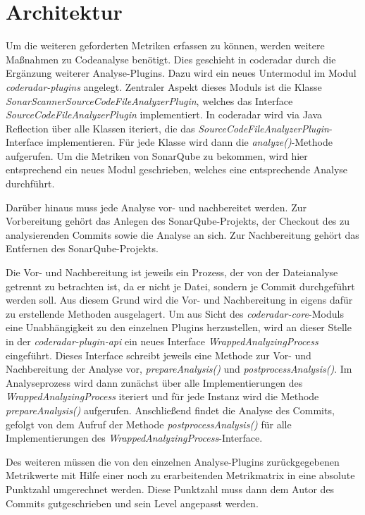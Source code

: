 \documentclass[
	oneside,  %
	ngerman, 
	final, 
	11pt, 
	a4paper, 
	1.1headlines, 
	headinclude=false, 
	footinclude=false, 
	mpinclude=false, 
	pagesize, 
	onecolumn, 
	titlepage, 
	parskip=half, 
	headsepline, 
	chapterprefix=false, 
	version=first, 
	listof=totoc, 
	bibliography=totoc, 
	toc=graduated, 
	fleqn
]{scrbook}
\begin{document}
\section{Architektur}
\label{Architektur}
Um die weiteren geforderten Metriken erfassen zu können, werden weitere Maßnahmen zu Codeanalyse benötigt.
Dies geschieht in coderadar durch die Ergänzung weiterer Analyse-Plugins.
Dazu wird ein neues Untermodul im Modul \textit{coderadar-plugins} angelegt.
Zentraler Aspekt dieses Moduls ist die Klasse \textit{SonarScannerSourceCodeFileAnalyzerPlugin}, welches das Interface \textit{SourceCodeFileAnalyzerPlugin} implementiert.
In coderadar wird via Java Reflection über alle Klassen iteriert, die das \textit{SourceCodeFileAnalyzerPlugin}-Interface implementieren.
Für jede Klasse wird dann die \textit{analyze()}-Methode aufgerufen.
Um die Metriken von SonarQube zu bekommen, wird hier entsprechend ein neues Modul geschrieben, welches eine entsprechende Analyse durchführt.

Darüber hinaus muss jede Analyse vor- und nachbereitet werden.
Zur Vorbereitung gehört das Anlegen des SonarQube-Projekts, der Checkout des zu analysierenden Commits sowie die Analyse an sich.
Zur Nachbereitung gehört das Entfernen des SonarQube-Projekts.

Die Vor- und Nachbereitung ist jeweils ein Prozess, der von der Dateianalyse getrennt zu betrachten ist, da er nicht je Datei, sondern je Commit durchgeführt werden soll.
Aus diesem Grund wird die Vor- und Nachbereitung in eigens dafür zu erstellende Methoden ausgelagert.
Um aus Sicht des \textit{coderadar-core}-Moduls eine Unabhängigkeit zu den einzelnen Plugins herzustellen, wird an dieser Stelle in der \textit{coderadar-plugin-api} ein neues Interface \textit{WrappedAnalyzingProcess} eingeführt.
Dieses Interface schreibt jeweils eine Methode zur Vor- und Nachbereitung der Analyse vor, \textit{prepareAnalysis()} und \textit{postprocessAnalysis()}.
Im Analyseprozess wird dann zunächst über alle Implementierungen des \textit{WrappedAnalyzingProcess} iteriert und für jede Instanz wird die Methode \textit{prepareAnalysis()} aufgerufen.
Anschließend findet die Analyse des Commits, gefolgt von dem Aufruf der Methode \textit{postprocessAnalysis()} für alle Implementierungen des \textit{WrappedAnalyzingProcess}-Interface.

Des weiteren müssen die von den einzelnen Analyse-Plugins zurückgegebenen Metrikwerte mit Hilfe einer noch zu erarbeitenden Metrikmatrix in eine absolute Punktzahl umgerechnet werden.
Diese Punktzahl muss dann dem Autor des Commits gutgeschrieben und sein Level angepasst werden.
\end{document}
